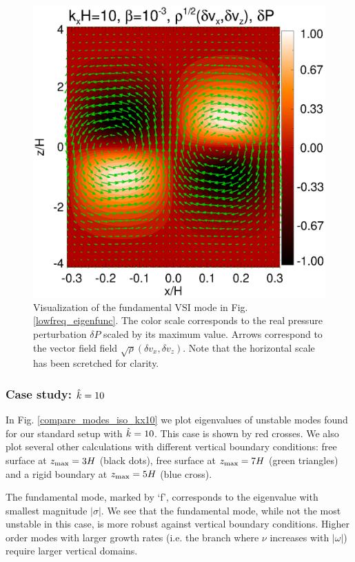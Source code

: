 \begin{figure}
  \includegraphics[width=\linewidth]{figures/result2d_iso}
  \caption{Visualization of the fundamental VSI mode in
    Fig. \ref{lowfreq_eigenfunc}. The color scale corresponds to the
    real pressure perturbation $\delta P$ scaled by its maximum value.
    Arrows correspond to the vector field 
    field $\sqrt{\rho}(\delta v_x,\delta v_z)$. Note that the horizontal scale has been scretched for clarity. 
    \label{lowfreq_eigenfunc_2d}
  }
\end{figure}


\subsubsection{Case study: $\hat{k}=10$}
In Fig. \ref{compare_modes_iso_kx10} we plot eigenvalues of unstable
modes found for our standard setup with $\hat{k}=10$. This case is shown
by red crosses. We also plot several other calculations with different
vertical boundary conditions: free surface at $z_\mathrm{max} = 3H$ (black
dots), free surface at $z_\mathrm{max}=7H$ (green triangles) and a rigid
boundary at $z_\mathrm{max}=5H$ (blue cross).   

The fundamental mode, marked by `f', corresponds to the eigenvalue
with smallest magnitude $|\sigma|$. We see that the fundamental mode,
while not the most unstable in this case, is more robust against
vertical boundary conditions. Higher order modes with larger growth
rates (i.e. the branch where $\nu$ increases with $|\omega|$) require
larger vertical domains. 

